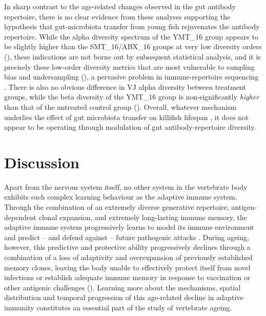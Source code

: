 In sharp contrast to the age-related changes observed in the gut antibody repertoire, there is no clear evidence from these analyses supporting the hypothesis that gut-microbiota transfer from young fish rejuvenates the antibody repertoire. While the alpha diversity spectrum of the YMT\_16 group appears to be slightly higher than the SMT\_16/ABX\_16 groups at very low diversity orders (), these indications are not borne out by subsequent statistical analysis, and it is precisely these low-order diversity metrics that are most vulnerable to sampling bias and undersampling (), a pervasive problem in immune-repertoire sequencing \parencite{mora2016diversity}. There is also no obvious difference in VJ alpha diversity between treatment groups, while the beta diversity of the YMT\_16 group is non-significantly \textit{higher} than that of the untreated control group (). Overall, whatever mechanism underlies the effect of gut microbiota transfer on killifish lifespan \parencite{smith2017microbiota}, it does not appear to be operating through modulation of gut antibody-repertoire diversity.

\FloatBarrier
\clearpage

\section{Discussion}
\label{sec:igseq_discussion}

Apart from the nervous system itself, no other system in the vertebrate body exhibits such complex learning behaviour as the adaptive immune system. Through the combination of an extremely diverse generative repertoire, antigen-dependent clonal expansion, and extremely long-lasting immune memory, the adaptive immune system progressively learns to model its immune environment and predict -- and defend against -- future pathogenic attacks \parencite{mayer2018memory}. During ageing, however, this predictive and protective ability progressively declines through a combination of a loss of adaptivity and overexpansion of previously established memory clones, leaving the body unable to effectively protect itself from novel infections or establish adequate immune memory in response to vaccination or other antigenic challenges (). Learning more about the mechanisms, spatial distribution and temporal progression of this age-related decline in adaptive immunity constitutes an essential part of the study of vertebrate ageing.

